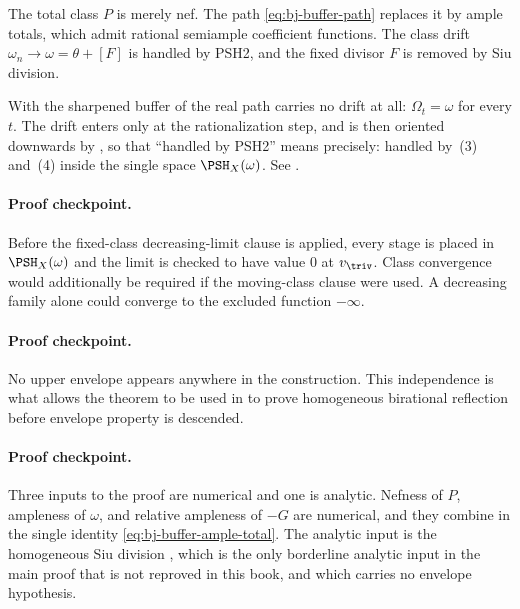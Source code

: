 \begin{remark}
\label{rem:ch38-nef-limit-ample-stages}
The total class $P$ is merely nef.  The path
\eqref{eq:bj-buffer-path} replaces it by ample totals, which admit rational
semiample coefficient functions.  The class drift
$\omega_n\to\omega=\theta+[F]$ is handled by PSH2, and the fixed divisor
$F$ is removed by Siu division.

With the sharpened buffer of  the real path carries
no drift at all: $\Omega_t=\omega$ for every $t$.  The drift enters only
at the rationalization step, and is then oriented downwards by
, so that ``handled by PSH2''
means precisely: handled by \,(3) and~(4) inside
the single space $\PSH_X(\omega)$.  See
.
\end{remark}

\paragraph{Proof checkpoint.}
Before the fixed-class decreasing-limit clause is applied, every
stage is placed in $\PSH_X(\omega)$ and the limit is checked to have
value $0$ at $v_{\triv}$. Class convergence would additionally be
required if the moving-class clause were used.  A
decreasing family alone could converge to the excluded function
$-\infty$.

\paragraph{Proof checkpoint.}
No upper envelope appears anywhere in the construction.  This independence
is what allows the theorem to be used in  to prove homogeneous
birational reflection before envelope property is descended.

\paragraph{Proof checkpoint.}
Three inputs to the proof are numerical and one is analytic.  Nefness of
$P$, ampleness of $\omega$, and relative ampleness of $-G$ are
numerical, and they combine in the single identity
\eqref{eq:bj-buffer-ample-total}.  The analytic input is the homogeneous
Siu division , which is the only
borderline analytic input in the main proof that is not reproved in this
book, and which carries no envelope hypothesis.

